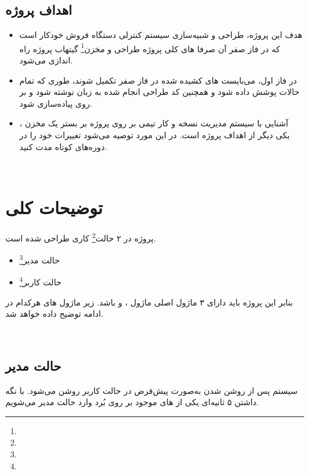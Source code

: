 \documentclass[]{article}
\begin{document}
\subsection*{{\titr اهداف پروژه}}
\begin{itemize}
	\item
	هدف این پروژه، طراحی و شبیه‌سازی سیستم کنترلی دستگاه فروش خودکار است که در فاز صفر آن صرفا  های کلی پروژه طراحی و مخزن\footnote{} گیتهاب پروژه راه اندازی می‌شود. 
	
	\item 
	در فاز اول، می‌بایست  های کشیده شده در فاز صفر تکمیل شوند، طوری که تمام حالات پوشش داده شود و همچنین کد طراحی انجام شده به زبان  نوشته شود و بر روی  پیاده‌سازی شود.
	\item 
	آشنایی با سیستم مدیریت نسخه  و کار تیمی بر روی پروژه بر بستر یک مخزن ، یکی دیگر از اهداف پروژه است. در این مورد توصیه می‌شود تغییرات خود را در دوره‌های کوتاه مدت  کنید.
\end{itemize}



 \Large \textbf{\\
}


\section*{{\titr توضیحات کلی }}
\label{sec:detail}

پروژه در ۲ حالت\footnote{} کاری طراحی شده است.
\begin{itemize}
	\item حالت مدیر\footnote{}
	\item حالت کاربر\footnote{}
\end{itemize}

بنابر این پروژه باید دارای ۳ ماژول اصلی ماژول ،  و   باشد. زیر ماژول های هرکدام در ادامه توضیح داده خواهد شد.





\newpage
\Large \textbf{\\
}

\subsection*{{\titr حالت مدیر}} 
سیستم پس از روشن شدن به‌صورت پیش‌فرض در حالت کاربر روشن می‌شود. با نگه داشتن ۵ ثانیه‌ای یکی از  های موجود بر روی بُرد وارد حالت مدیر می‌شویم.
\end{document}
